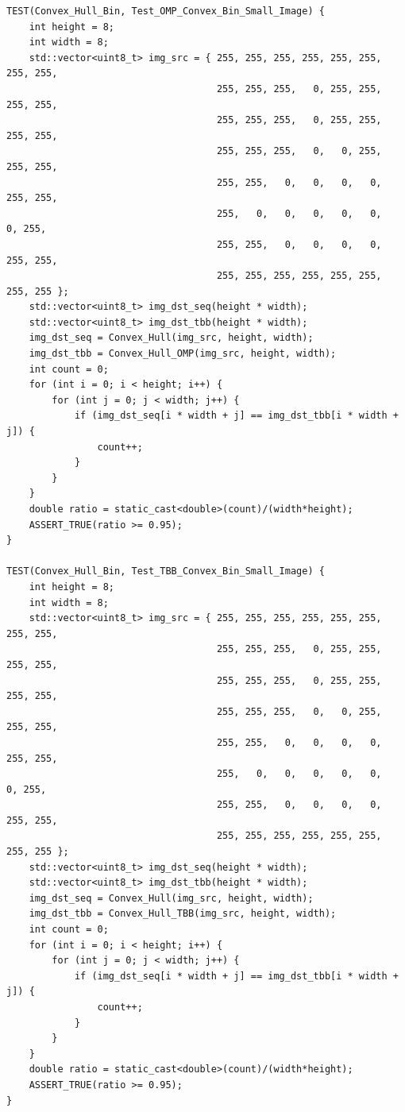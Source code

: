 \documentclass{report}
\begin{document}
\begin{lstlisting}
TEST(Convex_Hull_Bin, Test_OMP_Convex_Bin_Small_Image) {
    int height = 8;
    int width = 8;
    std::vector<uint8_t> img_src = { 255, 255, 255, 255, 255, 255, 255, 255,
                                     255, 255, 255,   0, 255, 255, 255, 255,
                                     255, 255, 255,   0, 255, 255, 255, 255,
                                     255, 255, 255,   0,   0, 255, 255, 255,
                                     255, 255,   0,   0,   0,   0, 255, 255,
                                     255,   0,   0,   0,   0,   0,   0, 255,
                                     255, 255,   0,   0,   0,   0, 255, 255,
                                     255, 255, 255, 255, 255, 255, 255, 255 };
    std::vector<uint8_t> img_dst_seq(height * width);
    std::vector<uint8_t> img_dst_tbb(height * width);
    img_dst_seq = Convex_Hull(img_src, height, width);
    img_dst_tbb = Convex_Hull_OMP(img_src, height, width);
    int count = 0;
    for (int i = 0; i < height; i++) {
        for (int j = 0; j < width; j++) {
            if (img_dst_seq[i * width + j] == img_dst_tbb[i * width + j]) {
                count++;
            }
        }
    }
    double ratio = static_cast<double>(count)/(width*height);
    ASSERT_TRUE(ratio >= 0.95);
}

TEST(Convex_Hull_Bin, Test_TBB_Convex_Bin_Small_Image) {
    int height = 8;
    int width = 8;
    std::vector<uint8_t> img_src = { 255, 255, 255, 255, 255, 255, 255, 255,
                                     255, 255, 255,   0, 255, 255, 255, 255,
                                     255, 255, 255,   0, 255, 255, 255, 255,
                                     255, 255, 255,   0,   0, 255, 255, 255,
                                     255, 255,   0,   0,   0,   0, 255, 255,
                                     255,   0,   0,   0,   0,   0,   0, 255,
                                     255, 255,   0,   0,   0,   0, 255, 255,
                                     255, 255, 255, 255, 255, 255, 255, 255 };
    std::vector<uint8_t> img_dst_seq(height * width);
    std::vector<uint8_t> img_dst_tbb(height * width);
    img_dst_seq = Convex_Hull(img_src, height, width);
    img_dst_tbb = Convex_Hull_TBB(img_src, height, width);
    int count = 0;
    for (int i = 0; i < height; i++) {
        for (int j = 0; j < width; j++) {
            if (img_dst_seq[i * width + j] == img_dst_tbb[i * width + j]) {
                count++;
            }
        }
    }
    double ratio = static_cast<double>(count)/(width*height);
    ASSERT_TRUE(ratio >= 0.95);
}


\end{lstlisting}
\end{document}
